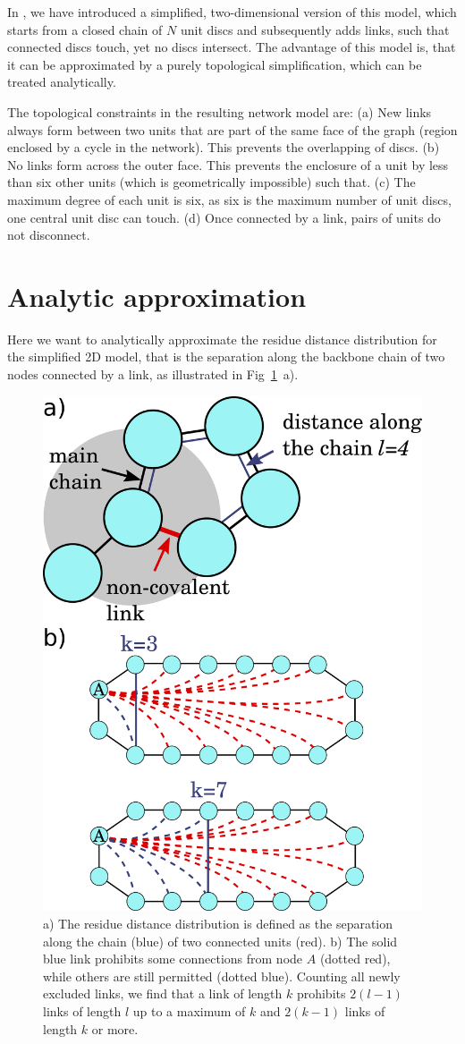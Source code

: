 \documentclass[
reprint,
twocolumn,
amsmath,amssymb,superscriptaddress,aps,
pre]{revtex4-1}
\begin{document}
In \cite{molkenthin2016scaling}, we have introduced a simplified, two-dimensional version of this model, which starts from a closed chain of $N$ unit discs and subsequently adds links, such that connected discs touch, yet no discs intersect. The advantage of this model is, that it can be approximated by a purely topological simplification, which can be treated analytically.

The topological constraints in the resulting network model are:
(a) New links always form between two units that are part of the same face of the graph (region enclosed by a cycle in the network). This prevents the overlapping of discs. (b) No links form across the outer face. This prevents the enclosure of a unit by less than six other units (which is geometrically impossible) such that. (c) The maximum degree of each unit is six, as six is the maximum number of unit discs, one central unit disc can touch. (d) Once connected by a link, pairs of units do not disconnect.

\section*{Analytic approximation}
Here we want to analytically approximate the residue distance distribution for the simplified 2D model, that is the separation along the backbone chain of two nodes connected by a link, as illustrated in Fig~\ref{fig:schematic}~a).

\begin{figure}[h]
    \centering
    \includegraphics[width=0.7\columnwidth]{figures/Fig1/Fig1.pdf}
    \caption{a) The residue distance distribution is defined as the separation along the chain (blue) of two connected units (red). b) The solid blue link prohibits some connections from node $A$ (dotted red), while others are still permitted (dotted blue). Counting all newly excluded links, we find that a link of length $k$ prohibits $2(l-1)$ links of length $l$ up to a maximum of $k$ and $2(k-1)$ links of length $k$ or more.}
    \label{fig:schematic}
\end{figure}
\end{document}
